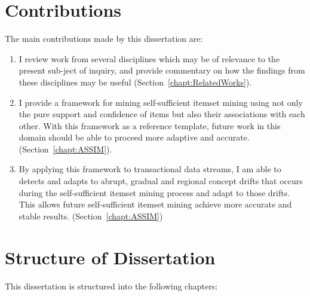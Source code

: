 \section{Contributions}

The main contributions made by this dissertation are:


\begin{enumerate}
\item I review work from several disciplines which may be of relevance to the present sub-ject of inquiry, and provide commentary on how the findings from these disciplines may be useful (Section~\ref{chapt:RelatedWorks}).

\item I provide a framework for mining self-sufficient itemset mining using not only the pure support and confidence of items but also their associations with each other. With this framework as a reference template, future work in this domain should be able to proceed more adaptive and accurate. (Section~\ref{chapt:ASSIM}).

\item By applying this framework to transactional data streams, I am able to detects and adapts to abrupt, gradual and regional concept drifts that occurs during the self-sufficient itemset mining process and adapt to those drifts. This allows future self-sufficient itemset mining achieve more accurate and stable results. (Section~\ref{chapt:ASSIM})

\end{enumerate}


\section{Structure of Dissertation}

This dissertation is structured into the following chapters:

